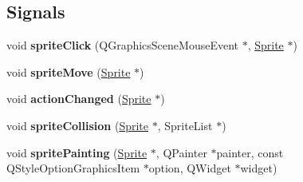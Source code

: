 \subsection*{Signals}
\begin{DoxyCompactItemize}
\item 
\mbox{\label{class_sprite_aa3e462d06474d09e40c5a793794622f8}} 
void {\bfseries sprite\+Click} (Q\+Graphics\+Scene\+Mouse\+Event $\ast$, \hyperlink{class_sprite}{Sprite} $\ast$)
\item 
\mbox{\label{class_sprite_a48ccbc5c26c6071cb179a243247c1250}} 
void {\bfseries sprite\+Move} (\hyperlink{class_sprite}{Sprite} $\ast$)
\item 
\mbox{\label{class_sprite_aac4537dfb67bc626f96e78fa09295f9b}} 
void {\bfseries action\+Changed} (\hyperlink{class_sprite}{Sprite} $\ast$)
\item 
\mbox{\label{class_sprite_a310fe32fd00d8f7a61f5a7a0dfb83c9b}} 
void {\bfseries sprite\+Collision} (\hyperlink{class_sprite}{Sprite} $\ast$, Sprite\+List $\ast$)
\item 
\mbox{\label{class_sprite_a54745b981741c82b59e65824752ba12e}} 
void {\bfseries sprite\+Painting} (\hyperlink{class_sprite}{Sprite} $\ast$, Q\+Painter $\ast$painter, const Q\+Style\+Option\+Graphics\+Item $\ast$option, Q\+Widget $\ast$widget)
\end{DoxyCompactItemize}
